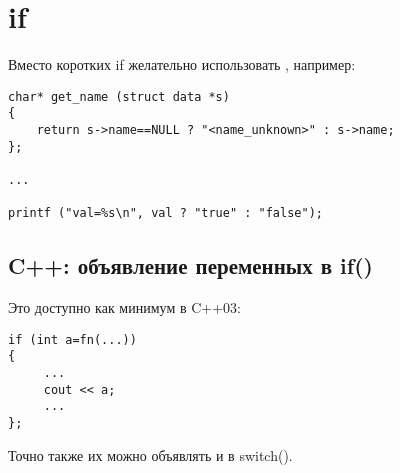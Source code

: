 ﻿\section{if}

Вместо коротких if желательно использовать , например:

\begin{lstlisting}
char* get_name (struct data *s)
{
	return s->name==NULL ? "<name_unknown>" : s->name;
};

...

printf ("val=%s\n", val ? "true" : "false");
\end{lstlisting}

\subsection{C++: объявление переменных в if()}

Это доступно как минимум в C++03:

\begin{lstlisting}
if (int a=fn(...))
{
     ...
     cout << a;
     ...
};
\end{lstlisting}

Точно также их можно объявлять и в switch().

